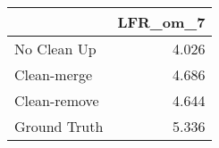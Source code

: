 \begin{tabular}{lr}
\toprule
{} & LFR_om_7 \\
\midrule
No Clean Up  &    4.026 \\
Clean-merge  &    4.686 \\
Clean-remove &    4.644 \\
Ground Truth &    5.336 \\
\bottomrule
\end{tabular}
